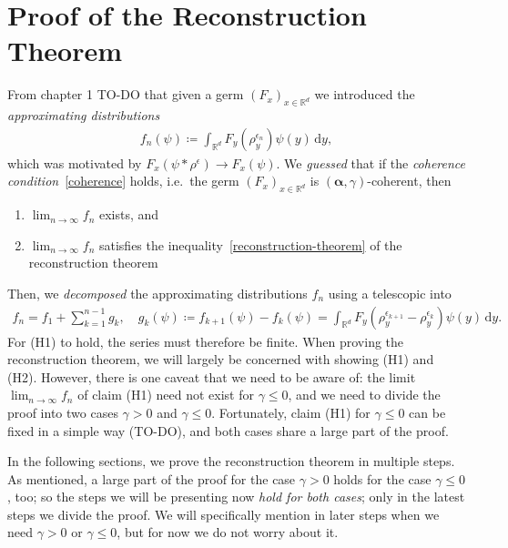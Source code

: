 
\chapter{Proof of the Reconstruction Theorem}\label{chapter:general-proof}

From chapter 1 TO-DO that given a germ \((F_x)_{x \in \mathbb{R}^d}\) we introduced the \emph{approximating distributions} 
\begin{align*}
    f_n(\psi) \coloneqq \int_{\mathbb{R}^d} F_y(\rho_y^{\epsilon_n}) \psi(y) \, \mathrm{d}y \tag{Approximating distributions},
\end{align*}
which was motivated by \(F_x(\psi * \rho^\epsilon) \to F_x(\psi)\). We \emph{guessed} that if the \emph{coherence condition}~\eqref{coherence} holds, i.e.\ the germ \((F_x)_{x \in \mathbb{R}^d}\) is \((\bm \alpha, \gamma)\)-coherent, then
\begin{enumerate}[label=(H\arabic*)] %
    \item \(\lim_{n \to \infty}f_n\) exists, and
    \item  \(\lim_{n \to \infty}f_n\) satisfies the inequality~\eqref{reconstruction-theorem} of the reconstruction theorem
 \end{enumerate}
 Then, we \emph{decomposed} the approximating distributions \(f_n\) using a telescopic into 
 \begin{align*}
    f_n = f_1 + \sum^{n-1}_{k=1}
    g_k, \quad g_k(\psi) \coloneqq f_{k+1}(\psi) - f_k(\psi) = \int_{\mathbb{R}^d} F_y(\rho_y^{\epsilon_{k+1}} - \rho_y^{\epsilon_k}) \psi(y)\, \mathrm{d}y.
 \end{align*}
For (H1) to hold, the series must therefore be finite. When proving the reconstruction theorem, we will largely be concerned with showing (H1) and (H2). However, there is one caveat that we need to be aware of: the limit \(\lim_{n \to \infty}f_n\) of claim (H1) need not exist for \(\gamma \leq 0\), and we need to divide the proof into two cases \(\gamma >0\) and \(\gamma \leq 0\). Fortunately, claim (H1) for \(\gamma \leq 0\) can be fixed in a simple way (TO-DO), and both cases share a large part of the proof. 

In the following sections, we prove the reconstruction theorem in multiple steps. As mentioned, a large part of the proof for the case \(\gamma > 0\) holds for the case \(\gamma \leq 0\), too; so the steps we will be presenting now \emph{hold for both cases}; only in the latest steps we divide the proof. We will specifically mention in later steps when we need \(\gamma > 0\) or \(\gamma\leq 0\), but for now we do not worry about it.

